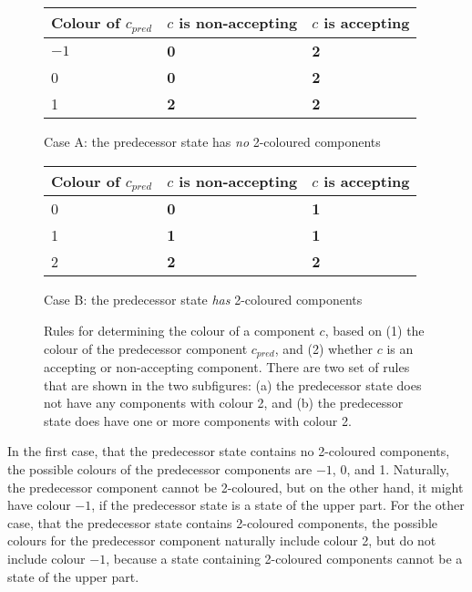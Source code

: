 \begin{figure}[htb]
\centering
  \begin{subtable}[t]{\textwidth}
  \renewcommand{\arraystretch}{1.3}
  \centering
  \begin{tabular}{|C{3cm}|C{3cm}|C{3cm}|}
    \hline
    Colour of $c_{pred}$ & $c$ is non-accepting & $c$ is accepting \\
    \hline
    $-1$ & \textbf{0} & \textbf{2} \\
    0 & \textbf{0} & \textbf{2} \\
    1 & \textbf{2} & \textbf{2} \\
    \hline
  \end{tabular}
  \caption{Case A: the predecessor state has \textit{no} 2-coloured components}
  \end{subtable}
  \vskip0.5cm

  \begin{subtable}[t]{\textwidth}
  \renewcommand{\arraystretch}{1.3}
  \centering
  \begin{tabular}{|C{3cm}|C{3cm}|C{3cm}|}
    \hline
    Colour of $c_{pred}$ & $c$ is non-accepting & $c$ is accepting \\
     & \textbf{0} & \textbf{1} \\
    1 & \textbf{1} & \textbf{1} \\
    2 & \textbf{2} & \textbf{2} \\
    \hline
  \end{tabular}
  \caption{Case B: the predecessor state \textit{has} 2-coloured components}
  \end{subtable}
\caption{Rules for determining the colour of a component $c$, based on (1) the colour of the predecessor component $c_{pred}$, and (2) whether $c$ is an accepting or non-accepting component. There are two set of rules that are shown in the two subfigures: (a) the predecessor state does not have any components with colour 2, and (b) the predecessor state does have one or more components with colour 2.}
\label{colour_rules}
\end{figure}

In the first case, that the predecessor state contains no 2-coloured components, the possible colours of the predecessor components are $-1$, 0, and 1. Naturally, the predecessor component cannot be 2-coloured, but on the other hand, it might have colour $-1$, if the predecessor state is a state of the upper part. For the other case, that the predecessor state contains 2-coloured components, the possible colours for the predecessor component naturally include colour 2, but do not include colour $-1$, because a state containing 2-coloured components cannot be a state of the upper part.

